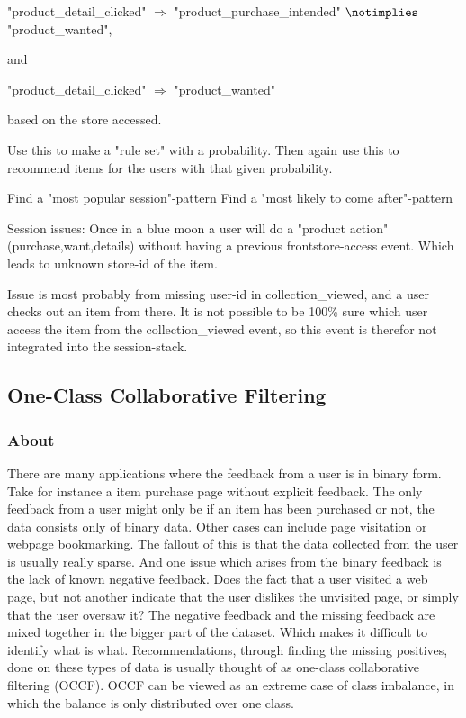 "product\_detail\_clicked" $\Rightarrow$ "product\_purchase\_intended" $\notimplies$ "product\_wanted",

and

"product\_detail\_clicked" $\Rightarrow$ "product\_wanted"

based on the store accessed.

Use this to make a "rule set" with a probability.
Then again use this to recommend items for the users with that given
probability.

Find a "most popular session"-pattern
Find a "most likely to come after"-pattern

Session issues:
Once in a blue moon a user will do a "product action" (purchase,want,details)
without having a previous frontstore-access event. Which leads to unknown
store-id of the item.

Issue is most probably from missing user-id in collection\_viewed, and a user
checks out an item from there. It is not possible to be 100\% sure which user
access the item from the collection\_viewed event, so this event is therefor
not integrated into the session-stack.



\subsection{One-Class Collaborative Filtering}

\subsubsection{About}
There are many applications where the feedback from a user is in binary form.
Take for instance a item purchase page without explicit feedback.  The only
feedback from a user might only be if an item has been purchased or not, the
data consists only of binary data.  Other cases can include page visitation or
webpage bookmarking.  The fallout of this is that the data collected from the
user is usually really sparse.  And one issue which arises from the binary
feedback is the lack of known negative feedback.  Does the fact that a user
visited a web page, but not another indicate that the user dislikes the
unvisited page, or simply that the user oversaw it?  The negative feedback and
the missing feedback are mixed together in the bigger part of the dataset.
Which makes it difficult to identify what is what.  Recommendations, through
finding the missing positives, done on these types of data is usually thought
of as one-class collaborative filtering (OCCF).  OCCF can be viewed as an
extreme case of class imbalance, in which the balance is only distributed over
one class. 


